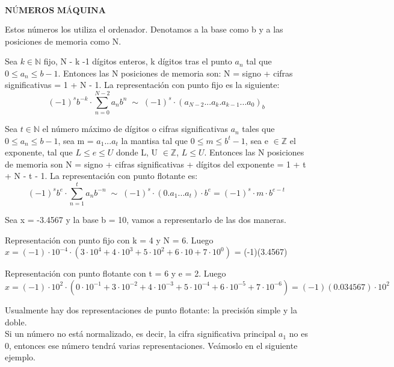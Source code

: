 $\textbf{NÚMEROS MÁQUINA}$

Estos números los utiliza el ordenador. Denotamos a la base como b y a las posiciones de memoria como N.

\begin{ndef}
Sea $k \in \mathbb{N}$ fijo, N - k -1 dígitos enteros, k dígitos tras el punto $a_n$ tal que $0 \leq a_n \leq b - 1$. Entonces las N posiciones de memoria son: N = signo + cifras significativas = 1 + N - 1. La representación con punto fijo es la siguiente:
\[ (-1)^s b^{-k} \cdot \sum_{n=0}^{N-2}a_nb^n \; \sim \; (-1)^s \cdot (a_{N-2}...a_k.a_{k-1}...a_0)_b \]
\end{ndef}

\begin{ndef}
Sea $t \in \mathbb{N}$ el número máximo de dígitos o cifras significativas $a_n$ tales que $0 \leq a_n \leq b - 1$, sea m = $a_1...a_t$ la mantisa tal que $0 \leq m \leq b^t - 1$, sea e $\in \mathbb{Z}$ el exponente, tal que $L \leq e \leq U$ donde L, U $\in \mathbb{Z}$, $L \leq U$. Entonces las N posiciones de memoria son N = signo + cifras significativas + dígitos del exponente = 1 + t + N - t - 1. La representación con punto flotante es:
\[ (-1)^sb^e \cdot \sum_{n=1}^t a_nb^{-n} \; \sim \; (-1)^s \cdot (0.a_1...a_t) \cdot b^e = (-1)^s \cdot m \cdot b^{e-t} \]
\end{ndef}

\begin{ejemplo}
Sea x = -3.4567 y la base b = 10, vamos a representarlo de las dos maneras.
	\begin{nlist}
	\item Representación con punto fijo con k = 4 y N = 6. Luego $x = (-1) \cdot 10^{-4} \cdot (3 \cdot 10^4 + 4 \cdot 10^3 + 5 \cdot 10^2 + 6 \cdot 10 + 7 \cdot 10^0)$ = (-1)(3.4567)
	\item Representación con punto flotante con t = 6 y e = 2. Luego $x = (-1) \cdot 10^2 \cdot (0 \cdot 10^{-1} + 3 \cdot 10^{-2} + 4 \cdot 10^{-3} + 5 \cdot 10^{-4} + 6 \cdot 10^{-5} + 7 \cdot 10^{-6}) = (-1)(0.034567) \cdot 10^2$
	\end{nlist}
\end{ejemplo}

Usualmente hay dos representaciones de punto flotante: la precisión simple y la doble.\\
Si un número no está normalizado, es decir, la cifra significativa principal $a_1$ no es 0, entonces ese número tendrá varias representaciones. Veámoslo en el siguiente ejemplo. 

